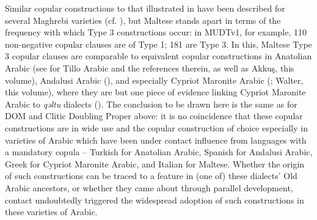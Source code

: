 \documentclass[output=paper]{langsci/langscibook}
\begin{document}
Similar copular constructions to that illustrated in  have been described for several Maghrebi varieties (cf. \citealt[355]{Vanhove1993}), but Maltese stands apart in terms of the frequency with which Type 3 constructions occur: in MUDTv1, for example, 110 non-negative copular clauses are of Type 1; 181 are Type 3. In this, Maltese Type 3 copular clauses are comparable to equivalent copular constructions in Anatolian Arabic (see \citealt[172--173]{Lahdo2009} for Tillo Arabic and the references therein, as well as Akkuş, this volume), Andalusi Arabic (\citealt[105]{Andalusi2013}), and especially Cypriot Maronite Arabic (\citealt[135]{Borg1985}; Walter, this volume), where they are but one piece of evidence linking Cypriot Maronite Arabic to \textit{qəltu} dialects (\citealt[31]{Borg2004}). The conclusion to be drawn here is the same as for DOM and Clitic Doubling Proper above: it is no coincidence that these copular constructions are in wide use and the copular construction of choice especially in varieties of Arabic which have been under contact influence from languages with a mandatory copula -- Turkish for Anatolian Arabic, Spanish for Andalusi Arabic, Greek for Cypriot Maronite Arabic, and Italian for Maltese. Whether the origin of such constructions can be traced to a feature in (one of) these dialects' Old Arabic ancestors, or whether they came about through parallel development, contact undoubtedly triggered the widespread adoption of such constructions in these varieties of Arabic.
\end{document}
